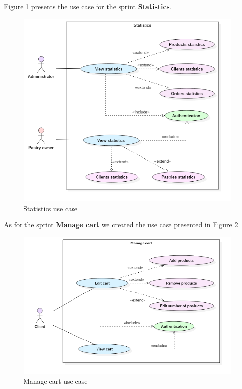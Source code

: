 \documentclass[12pt,a4paper]{report}
\begin{document}
Figure \ref{statistics-usecase} presents the use case for the sprint  \textbf{Statistics}.
\begin{figure}[H]
	\vspace*{2cm}
	\centering
	\includegraphics[width=7in,keepaspectratio]{statistics.png}
	\caption{Statistics use case}
	\label{statistics-usecase}
	
\end{figure}
\clearpage
As for the sprint \textbf{Manage cart} we created the use case presented in Figure \ref{managecart-usecase}
\begin{figure}[H]
	
	\centering
	\includegraphics[width=5in,keepaspectratio]{manageCart.png}
	\caption{Manage cart use case}
	\label{managecart-usecase}
	
\end{figure}
\end{document}
